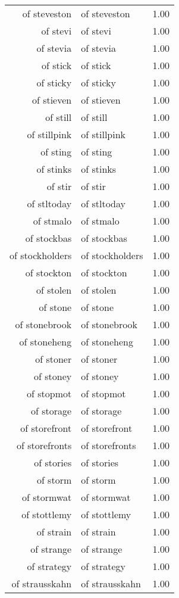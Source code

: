 \begin{table}[ht]
\begin{tabular}{rlr}
  of steveston & of steveston & 1.00 \\ 
  of stevi & of stevi & 1.00 \\ 
  of stevia & of stevia & 1.00 \\ 
  of stick & of stick & 1.00 \\ 
  of sticky & of sticky & 1.00 \\ 
  of stieven & of stieven & 1.00 \\ 
  of still & of still & 1.00 \\ 
  of stillpink & of stillpink & 1.00 \\ 
  of sting & of sting & 1.00 \\ 
  of stinks & of stinks & 1.00 \\ 
  of stir & of stir & 1.00 \\ 
  of stltoday & of stltoday & 1.00 \\ 
  of stmalo & of stmalo & 1.00 \\ 
  of stockbas & of stockbas & 1.00 \\ 
  of stockholders & of stockholders & 1.00 \\ 
  of stockton & of stockton & 1.00 \\ 
  of stolen & of stolen & 1.00 \\ 
  of stone & of stone & 1.00 \\ 
  of stonebrook & of stonebrook & 1.00 \\ 
  of stoneheng & of stoneheng & 1.00 \\ 
  of stoner & of stoner & 1.00 \\ 
  of stoney & of stoney & 1.00 \\ 
  of stopmot & of stopmot & 1.00 \\ 
  of storage & of storage & 1.00 \\ 
  of storefront & of storefront & 1.00 \\ 
  of storefronts & of storefronts & 1.00 \\ 
  of stories & of stories & 1.00 \\ 
  of storm & of storm & 1.00 \\ 
  of stormwat & of stormwat & 1.00 \\ 
  of stottlemy & of stottlemy & 1.00 \\ 
  of strain & of strain & 1.00 \\ 
  of strange & of strange & 1.00 \\ 
  of strategy & of strategy & 1.00 \\ 
  of strausskahn & of strausskahn & 1.00 \\ 

\end{tabular}
\end{table}
